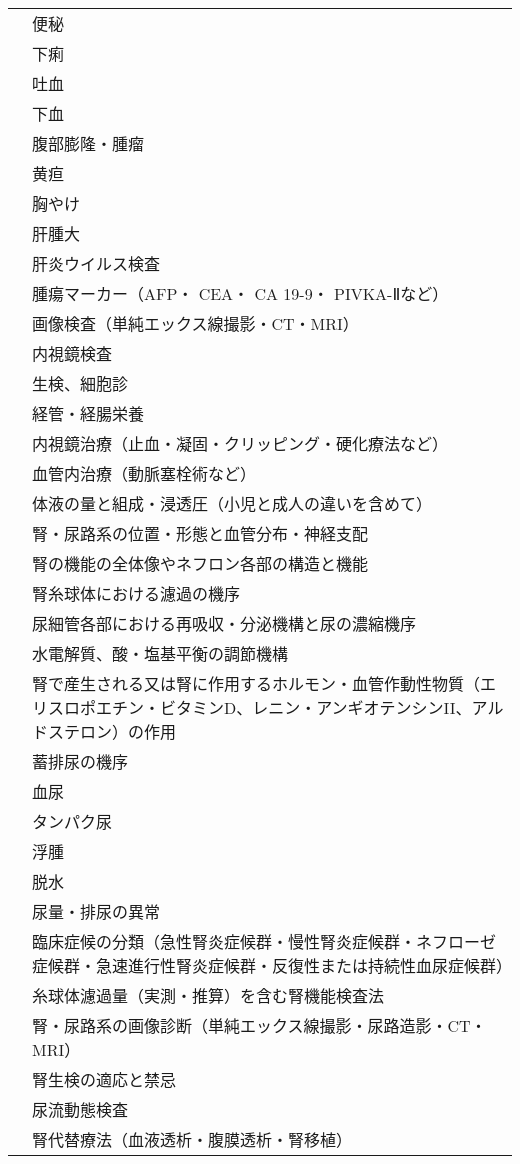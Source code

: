 \begin{xltabular}{\linewidth}{XX}
 & 便秘 \\
 & 下痢 \\
 & 吐血 \\
 & 下血 \\
 & 腹部膨隆・腫瘤 \\
 & 黄疸 \\
 & 胸やけ \\
 & 肝腫大 \\
 & 肝炎ウイルス検査 \\
 & 腫瘍マーカー（AFP・ CEA・ CA 19-9・ PIVKA-Ⅱなど） \\
 & 画像検査（単純エックス線撮影・CT・MRI） \\
 & 内視鏡検査 \\
 & 生検、細胞診 \\
 & 経管・経腸栄養 \\
 & 内視鏡治療（止血・凝固・クリッピング・硬化療法など） \\
 & 血管内治療（動脈塞栓術など） \\
 & 体液の量と組成・浸透圧（小児と成人の違いを含めて） \\
 & 腎・尿路系の位置・形態と血管分布・神経支配 \\
 & 腎の機能の全体像やネフロン各部の構造と機能 \\
 & 腎糸球体における濾過の機序 \\
 & 尿細管各部における再吸収・分泌機構と尿の濃縮機序 \\
 & 水電解質、酸・塩基平衡の調節機構 \\
 & 腎で産生される又は腎に作用するホルモン・血管作動性物質（エリスロポエチン・ビタミンD、レニン・アンギオテンシンII、アルドステロン）の作用 \\
 & 蓄排尿の機序 \\
 & 血尿 \\
 & タンパク尿 \\
 & 浮腫 \\
 & 脱水 \\
 & 尿量・排尿の異常 \\
 & 臨床症候の分類（急性腎炎症候群・慢性腎炎症候群・ネフローゼ症候群・急速進行性腎炎症候群・反復性または持続性血尿症候群） \\
 & 糸球体濾過量（実測・推算）を含む腎機能検査法 \\
 & 腎・尿路系の画像診断（単純エックス線撮影・尿路造影・CT・MRI） \\
 & 腎生検の適応と禁忌 \\
 & 尿流動態検査 \\
 & 腎代替療法（血液透析・腹膜透析・腎移植） \\

\end{xltabular}
